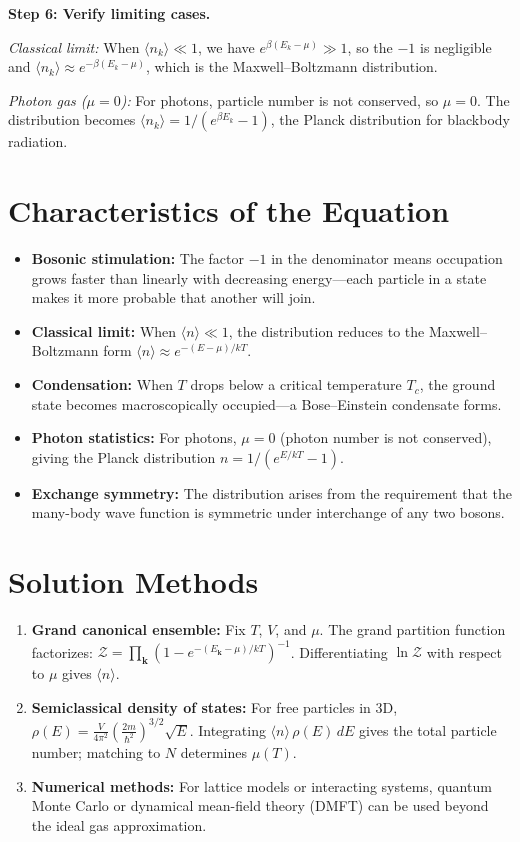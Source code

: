 \textbf{Step 6: Verify limiting cases.}

\emph{Classical limit:} When $\langle n_k \rangle \ll 1$, we have $e^{\beta(E_k - \mu)} \gg 1$, so the $-1$ is negligible and $\langle n_k \rangle \approx e^{-\beta(E_k - \mu)}$, which is the Maxwell--Boltzmann distribution.

\emph{Photon gas ($\mu = 0$):} For photons, particle number is not conserved, so $\mu = 0$. The distribution becomes $\langle n_k \rangle = 1/(e^{\beta E_k} - 1)$, the Planck distribution for blackbody radiation.

\section*{Characteristics of the Equation}

\begin{itemize}
\item \textbf{Bosonic stimulation:} The factor $-1$ in the denominator means occupation grows faster than linearly with decreasing energy---each particle in a state makes it more probable that another will join.
\item \textbf{Classical limit:} When $\langle n \rangle \ll 1$, the distribution reduces to the Maxwell--Boltzmann form $\langle n \rangle \approx e^{-(E-\mu)/kT}$.
\item \textbf{Condensation:} When $T$ drops below a critical temperature $T_c$, the ground state becomes macroscopically occupied---a Bose--Einstein condensate forms.
\item \textbf{Photon statistics:} For photons, $\mu = 0$ (photon number is not conserved), giving the Planck distribution $n = 1/(e^{E/kT} - 1)$.
\item \textbf{Exchange symmetry:} The distribution arises from the requirement that the many-body wave function is symmetric under interchange of any two bosons.
\end{itemize}
\section*{Solution Methods}

\begin{enumerate}
\item \textbf{Grand canonical ensemble:} Fix $T$, $V$, and $\mu$. The grand partition function factorizes: $\mathcal{Z} = \prod_{\mathbf{k}} (1 - e^{-(E_{\mathbf{k}}-\mu)/kT})^{-1}$. Differentiating $\ln \mathcal{Z}$ with respect to $\mu$ gives $\langle n \rangle$.
\item \textbf{Semiclassical density of states:} For free particles in 3D, $\rho(E) = \frac{V}{4\pi^2}\left(\frac{2m}{\hbar^2}\right)^{3/2} \sqrt{E}$. Integrating $\langle n \rangle \, \rho(E) \, dE$ gives the total particle number; matching to $N$ determines $\mu(T)$.
\item \textbf{Numerical methods:} For lattice models or interacting systems, quantum Monte Carlo or dynamical mean-field theory (DMFT) can be used beyond the ideal gas approximation.
\end{enumerate}
